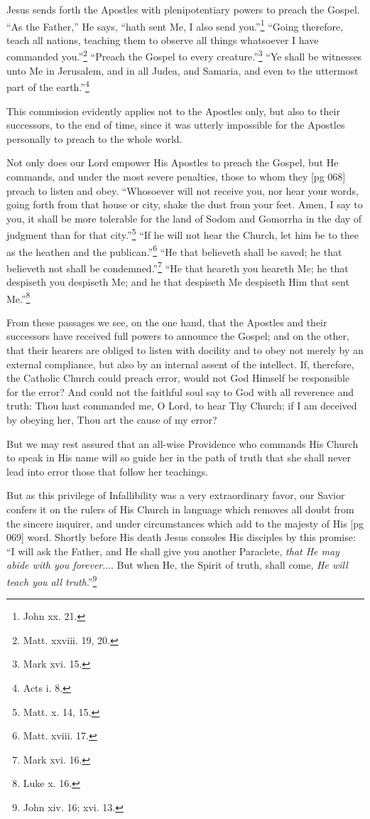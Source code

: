 Jesus sends forth the Apostles with plenipotentiary
powers to preach the Gospel. “As the
Father,” He says, “hath sent Me, I also send
you.”\footnote{John xx. 21.} “Going therefore, teach all nations,
teaching them to observe all things whatsoever
I have commanded you.”\footnote{Matt. xxviii. 19, 20.}
“Preach the Gospel to every creature.”\footnote{Mark xvi. 15.}
“Ye shall be witnesses unto
Me in Jerusalem, and in all Judea, and Samaria,
and even to the uttermost part of the earth.”\footnote{Acts i. 8.}

This commission evidently applies not to the
Apostles only, but also to their successors, to
the end of time, since it was utterly impossible
for the Apostles personally to preach to the whole
world.

Not only does our Lord empower His Apostles
to preach the Gospel, but He commands, and under
the most severe penalties, those to whom they
[pg 068]
preach to listen and obey. “Whosoever will not
receive you, nor hear your words, going forth
from that house or city, shake the dust from your
feet. Amen, I say to you, it shall be more tolerable
for the land of Sodom and Gomorrha in the
day of judgment than for that city.”\footnote{Matt.
x. 14, 15.} “If he
will not hear the Church, let him be to thee as the
heathen and the publican.”\footnote{Matt.
xviii. 17.} “He that believeth
shall be saved; he that believeth not shall be condemned.”\footnote{Mark
xvi. 16.}
“He that heareth you heareth Me;
he that despiseth you despiseth Me; and he that
despiseth Me despiseth Him that sent Me.”\footnote{Luke x. 16.}

From these passages we see, on the one hand,
that the Apostles and their successors have received
full powers to announce the Gospel; and
on the other, that their hearers are obliged to
listen with docility and to obey not merely by
an external compliance, but also by an internal
assent of the intellect. If, therefore, the Catholic
Church could preach error, would not God Himself
be responsible for the error? And could not
the faithful soul say to God with all reverence
and truth: Thou hast commanded me, O Lord,
to hear Thy Church; if I am deceived by obeying
her, Thou art the cause of my error?

But we may rest assured that an all-wise Providence
who commands His Church to speak in
His name will so guide her in the path of truth
that she shall never lead into error those that
follow her teachings.

But as this privilege of Infallibility was a very
extraordinary favor, our Savior confers it on the
rulers of His Church in language which removes
all doubt from the sincere inquirer, and under
circumstances which add to the majesty of His
[pg 069]
word. Shortly before His death Jesus consoles
His disciples by this promise: “I will ask the
Father, and He shall give you another Paraclete,
\emph{that He may abide with you forever}.... But
when He, the Spirit of truth, shall come, \emph{He will
teach you all truth}.”\footnote{John xiv. 16; xvi. 13.}

